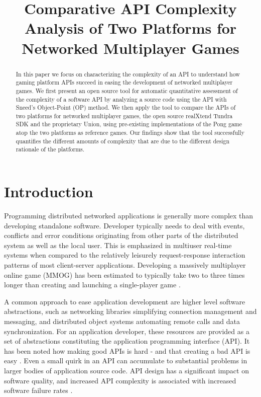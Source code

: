 \documentclass[conference]{IEEEtran}
\title{Comparative API Complexity Analysis of Two Platforms for Networked Multiplayer Games}
\author{
  \IEEEauthorblockN{
    Toni Alatalo\IEEEauthorrefmark{1}\IEEEauthorrefmark{2}
    Erno Kuusela\IEEEauthorrefmark{1}\IEEEauthorrefmark{2} 
    Rauli Puuperä\IEEEauthorrefmark{1}\IEEEauthorrefmark{2}
    and Timo Ojala\IEEEauthorrefmark{1}
  }
  \IEEEauthorblockA{\IEEEauthorrefmark{1}Department of Computer Science and Engineering, University of Oulu}
  \IEEEauthorblockA{\IEEEauthorrefmark{2}Playsign Ltd., Oulu, Finland}
}
\date{}
\begin{document}
\maketitle
\begin{abstract}

In this paper we focus on characterizing the complexity of an API to
understand how gaming platform APIs succeed in easing the development
of networked multiplayer games. We first present an open source tool
for automatic quantitative assessment of the complexity of a software
API by analyzing a source code using the API with Sneed's Object-Point
(OP) method. We then apply the tool to compare the APIs of two
platforms for networked multiplayer games, the open source realXtend
Tundra SDK and the proprietary Union, using pre-existing
implementations of the Pong game atop the two platforms as reference
games. Our findings show that the tool successfully quantifies the
different amounts of complexity that are due to the different design
rationale of the platforms.

\end{abstract}

\section{Introduction%
  \label{introduction}%
}

Programming distributed networked applications is generally more
complex than developing standalone software. Developer typically needs
to deal with events, conflicts and error conditions originating from
other parts of the distributed system as well as the local user. This
is emphasized in multiuser real-time systems when compared to the
relatively leisurely request-response interaction patterns of most
client-server applications. Developing a massively multiplayer online
game (MMOG) has been estimated to typically take two to three times
longer than creating and launching a single-player game \cite{middleware}.

A common approach to ease application development are higher level
software abstractions, such as networking libraries simplifying
connection management and messaging, and distributed object systems
automating remote calls and data synchronization. For an application
developer, these resources are provided as a set of abstractions
constituting the application programming interface (API). It has been
noted how making good APIs is hard - and that creating a bad API is
easy \cite{api-matters}. Even a small quirk in an API can accumulate
to substantial problems in larger bodies of application source
code. API design has a significant impact on software quality, and
increased API complexity is associated with increased software failure
rates \cite{cmu-api_failures}.
\end{document}
